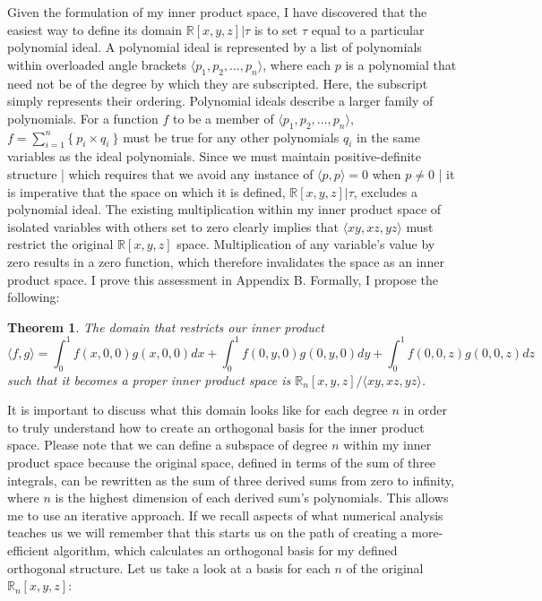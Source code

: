 \documentclass[letterpaper, 12pt]{article}
\newtheorem{thm}{Theorem}[section]
\begin{document}
Given the formulation of my inner product space, I have discovered that the easiest way to define its domain $\mathbb{R} [x, y, z] | \tau$ is to set $\tau$ equal to a particular polynomial ideal. A polynomial ideal is represented by a list of polynomials within overloaded angle brackets $\langle p_1, p_2, \ldots, p_n\rangle$, where each $p$ is a polynomial that need not be of the degree by which they are subscripted. Here, the subscript simply represents their ordering. Polynomial ideals describe a larger family of polynomials. For a function $f$ to be a member of  $\langle p_1, p_2, \ldots, p_n\rangle$, $f = \sum_{i=1}^n\{ \ p_i\times q_i\ \}$ must be true for any other polynomials $q_i$ in the same variables as the ideal polynomials. Since we must maintain positive-definite structure | which requires that we avoid any instance of $\langle p, p\rangle=0$ when $p \neq 0$ | it is imperative that the space on which it is defined, $\mathbb{R} [x, y, z] | \tau$, excludes a polynomial ideal. The existing multiplication within my inner product space of isolated variables with others set to zero clearly implies that $\langle xy, xz, yz\rangle$ must restrict the original $\mathbb{R} [x, y, z]$ space. Multiplication of any variable's value by zero results in a zero function, which therefore invalidates the space as an inner product space. I prove this assessment in Appendix B. Formally, I propose the following:

\vspace{1mm}
\begin{thm}
	The domain that restricts our inner product
	$$\langle f, g\rangle = \int_0^1 f(x,0,0)g(x,0,0) dx + \int_0^1 f(0,y,0)g(0,y,0) dy + \int_0^1 f(0,0,z)g(0,0,z) dz$$
	such that it becomes a proper inner product space is $\mathbb{R}_n [x, y, z] / \langle xy, xz, yz \rangle$.
\end{thm}

\vspace{1mm}
It is important to discuss what this domain looks like for each degree $n$ in order to truly understand how to create an orthogonal basis for the inner product space. Please note that we can define a subspace of degree $n$ within my inner product space because the original space, defined in terms of the sum of three integrals, can be rewritten as the sum of three derived sums from zero to infinity, where $n$ is the highest dimension of each derived sum's polynomials. This allows me to use an iterative approach. If we recall aspects of what numerical analysis teaches us we will remember that this starts us on the path of creating a more-efficient algorithm, which calculates an orthogonal basis for my defined orthogonal structure. Let us take a look at a basis for each $n$ of the original $\mathbb{R}_n [x, y, z]$:
\end{document}
